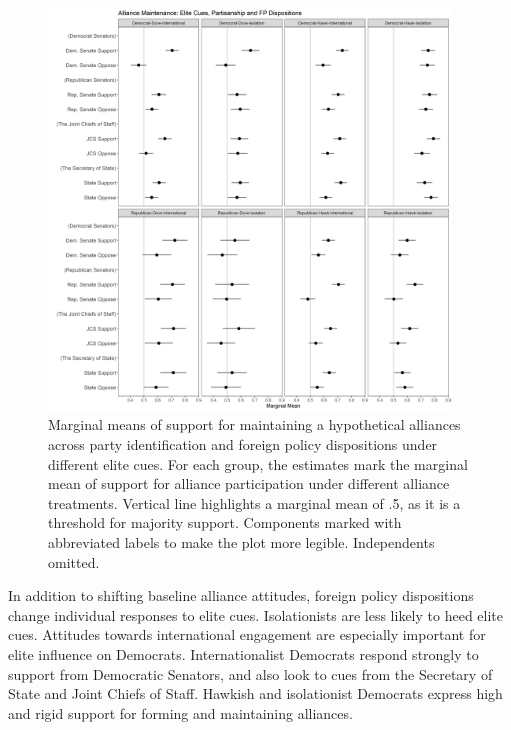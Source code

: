 \documentclass[12pt]{article}
\begin{document}
\begin{figure}
	\centering
		\includegraphics[width=0.95\textwidth]{../figures/party-dispo-main-el.png}
	\caption{Marginal means of support for maintaining a hypothetical alliances across party identification and foreign policy dispositions under different elite cues. For each group, the estimates mark the marginal mean of support for alliance participation under different alliance treatments. Vertical line highlights a marginal mean of .5, as it is a threshold for majority support. Components marked with abbreviated labels to make the plot more legible. Independents omitted.}
	\label{fig:party-dispo-main-el}
\end{figure}


In addition to shifting baseline alliance attitudes, foreign policy dispositions change individual responses to elite cues. 
Isolationists are less likely to heed elite cues. 
Attitudes towards international engagement are especially important for elite influence on Democrats. 
Internationalist Democrats respond strongly to support from Democratic Senators, and also look to cues from the Secretary of State and Joint Chiefs of Staff. 
Hawkish and isolationist Democrats express high and rigid support for forming and maintaining alliances. 
\end{document}
